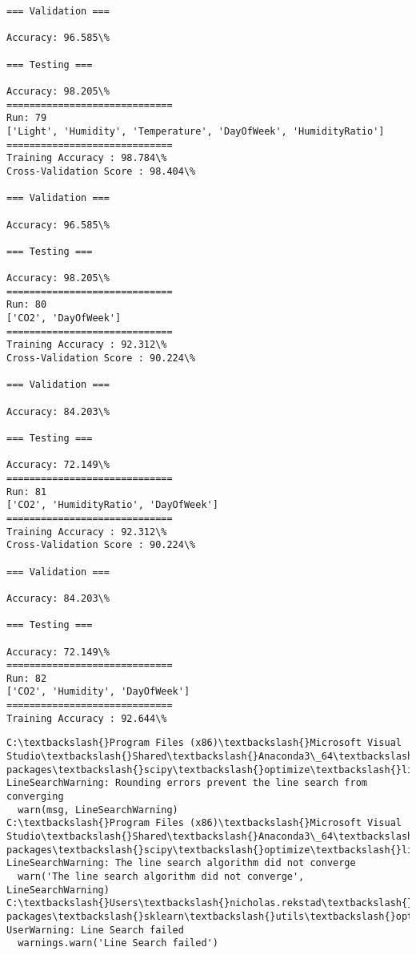 \documentclass[11pt]{article}
\begin{document}
\begin{Verbatim}[commandchars=\\\{\}]
=== Validation ===

Accuracy: 96.585\%

=== Testing ===

Accuracy: 98.205\%
=============================
Run: 79
['Light', 'Humidity', 'Temperature', 'DayOfWeek', 'HumidityRatio']
=============================
Training Accuracy : 98.784\%
Cross-Validation Score : 98.404\%

=== Validation ===

Accuracy: 96.585\%

=== Testing ===

Accuracy: 98.205\%
=============================
Run: 80
['CO2', 'DayOfWeek']
=============================
Training Accuracy : 92.312\%
Cross-Validation Score : 90.224\%

=== Validation ===

Accuracy: 84.203\%

=== Testing ===

Accuracy: 72.149\%
=============================
Run: 81
['CO2', 'HumidityRatio', 'DayOfWeek']
=============================
Training Accuracy : 92.312\%
Cross-Validation Score : 90.224\%

=== Validation ===

Accuracy: 84.203\%

=== Testing ===

Accuracy: 72.149\%
=============================
Run: 82
['CO2', 'Humidity', 'DayOfWeek']
=============================
Training Accuracy : 92.644\%

    \end{Verbatim}

    \begin{Verbatim}[commandchars=\\\{\}]
C:\textbackslash{}Program Files (x86)\textbackslash{}Microsoft Visual Studio\textbackslash{}Shared\textbackslash{}Anaconda3\_64\textbackslash{}lib\textbackslash{}site-packages\textbackslash{}scipy\textbackslash{}optimize\textbackslash{}linesearch.py:422: LineSearchWarning: Rounding errors prevent the line search from converging
  warn(msg, LineSearchWarning)
C:\textbackslash{}Program Files (x86)\textbackslash{}Microsoft Visual Studio\textbackslash{}Shared\textbackslash{}Anaconda3\_64\textbackslash{}lib\textbackslash{}site-packages\textbackslash{}scipy\textbackslash{}optimize\textbackslash{}linesearch.py:313: LineSearchWarning: The line search algorithm did not converge
  warn('The line search algorithm did not converge', LineSearchWarning)
C:\textbackslash{}Users\textbackslash{}nicholas.rekstad\textbackslash{}AppData\textbackslash{}Roaming\textbackslash{}Python\textbackslash{}Python36\textbackslash{}site-packages\textbackslash{}sklearn\textbackslash{}utils\textbackslash{}optimize.py:195: UserWarning: Line Search failed
  warnings.warn('Line Search failed')

    \end{Verbatim}
\end{document}
